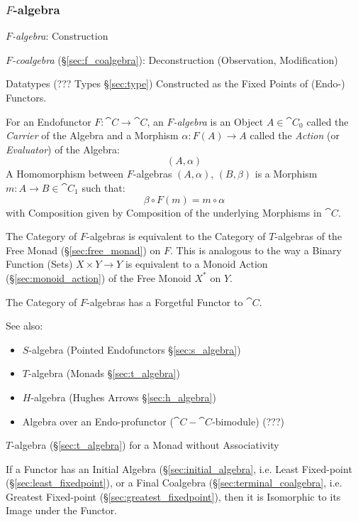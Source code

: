 \subsubsection{$F$-algebra}\label{sec:f_algebra}

\emph{$F$-algebra}: Construction

\emph{$F$-coalgebra} (\S\ref{sec:f_coalgebra}): Deconstruction
(Observation, Modification)

Datatypes (??? Types \S\ref{sec:type}) Constructed as the Fixed Points
of (Endo-) Functors. \cite{jones95} %

For an Endofunctor $F : \cat{C} \rightarrow \cat{C}$, an
\emph{$F$-algebra} is an Object $A \in \cat{C}_0$ called the
\emph{Carrier} of the Algebra and a Morphism $\alpha : F (A)
\rightarrow A$ called the \emph{Action} (or \emph{Evaluator}) of the
Algebra: \cite{corfield08}
\[
  (A,\alpha)
\]
A Homomorphism between $F$-algebras $(A,\alpha)$, $(B,\beta)$ is a
Morphism $m : A \rightarrow B \in \cat{C}_1$ such that:
\[
  \beta \circ F(m) = m \circ \alpha
\]
with Composition given by Composition of the underlying Morphisms in
$\cat{C}$.

The Category of $F$-algebras is equivalent to the Category of
$T$-algebras of the Free Monad (\S\ref{sec:free_monad}) on $F$. This
is analogous to the way a Binary Function (Sets) $X \times Y
\rightarrow Y$ is equivalent to a Monoid Action
(\S\ref{sec:monoid_action}) of the Free Monoid $X^*$ on $Y$.

The Category of $F$-algebras has a Forgetful Functor to $\cat{C}$.

\fist See also:
\begin{itemize}
  \item $S$-algebra (Pointed Endofunctors \S\ref{sec:s_algebra})
  \item $T$-algebra (Monads \S\ref{sec:t_algebra})
  \item $H$-algebra (Hughes Arrows \S\ref{sec:h_algebra})
  \item Algebra over an Endo-profunctor ($\cat{C}-\cat{C}$-bimodule)
    (???) %
\end{itemize}

$T$-algebra (\S\ref{sec:t_algebra}) for a Monad without Associativity

If a Functor has an Initial Algebra (\S\ref{sec:initial_algebra},
i.e. Least Fixed-point (\S\ref{sec:least_fixedpoint}), or a Final
Coalgebra (\S\ref{sec:terminal_coalgebra}, i.e. Greatest Fixed-point
(\S\ref{sec:greatest_fixedpoint}), then it is Isomorphic to its Image
under the Functor. \cite{corfield08}

